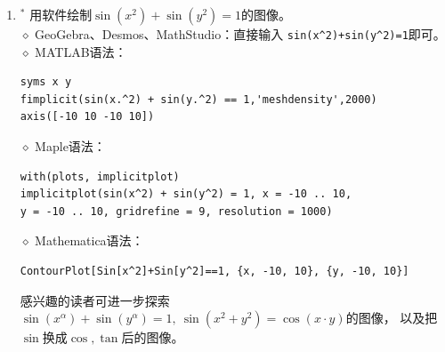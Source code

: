 \begin{enumerate}[label={\textbf{\thechapter.\arabic*}},leftmargin=
    \inteval{\myenumleftmargin}pt]
\item$ ^* $ 用软件绘制$ \sin(x^2)+\sin(y^2)=1 $的图像。\\
$\diamond$ GeoGebra、Desmos、MathStudio：直接输入
\verb|sin(x^2)+sin(y^2)=1|即可。\\
$\diamond$ MATLAB语法：
\begin{lstlisting}
syms x y
fimplicit(sin(x.^2) + sin(y.^2) == 1,'meshdensity',2000)
axis([-10 10 -10 10])    
\end{lstlisting} 
$\diamond$ Maple语法：
\begin{lstlisting}
with(plots, implicitplot)
implicitplot(sin(x^2) + sin(y^2) = 1, x = -10 .. 10, 
y = -10 .. 10, gridrefine = 9, resolution = 1000)    
\end{lstlisting} 
$\diamond$ Mathematica语法：
\begin{lstlisting}
ContourPlot[Sin[x^2]+Sin[y^2]==1, {x, -10, 10}, {y, -10, 10}]    
\end{lstlisting} 

感兴趣的读者可进一步探索$ \sin(x^{\alpha})+\sin(y^{\alpha})=1,\ 
\sin\left(x^{2}+y^{2}\right)=\cos\left(x\cdot y\right) $的图像，
以及把$ \sin $换成$ \cos,\tan $后的图像。

\end{enumerate}

